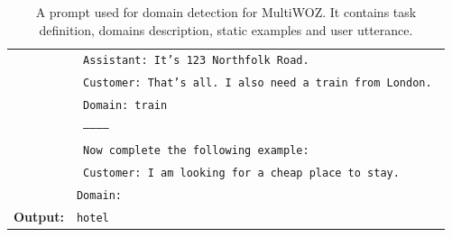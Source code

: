 \begin{table}[H]
\begin{tabular}{rl}
&\texttt{{\color{red!50!yellow!90!black!100!} Assistant: It's 123 Northfolk Road. }} \\
& \texttt{ {\color{red!50!yellow!90!black!100!} Customer: That's all. I also need a train from London. }} \\
&  \texttt{{\color{red!50!yellow!90!black!100!} Domain: train }}\\
& \texttt{{\color{red!50!yellow!90!black!100!} ----------- }} \\
& \texttt{{\color{cyan!80!yellow!80!black!100 } Now complete the following example:}} \\
& \texttt{{\color{orange!50!yellow!90!black!100!} Customer: I am looking for a cheap place to stay. }}\\
& \texttt{Domain:} \\
      \midrule
      \textbf{Output:} & \texttt{hotel} \\
      \bottomrule
  \end{tabular}
    \caption{A prompt used for domain detection for MultiWOZ.
  It contains {\color{cyan!80!yellow!80!black!100} task definition},  {\color{green!100!yellow!70!black!100!}domains description}, {\color{red!50!yellow!90!black!100!} static examples} and {\color{orange!50!yellow!90!black!100!} user utterance}.}
  \label{07_tab:domain}
\end{table}

